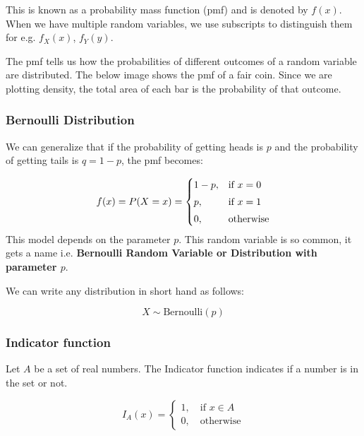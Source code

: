 This is known as a probability mass function (pmf) and is denoted by $f(x)$. When we have multiple random variables, we use subscripts to distinguish them for e.g. $f_X(x)$, $f_Y(y)$.

The pmf tells us how the probabilities of different outcomes of a random variable are distributed. The below image shows the pmf of a fair coin. Since we are plotting density, the total area of each bar is the probability of that outcome.


\subsubsection{Bernoulli Distribution}

We can generalize that if the probability of getting heads is $p$ and the probability of getting tails is $q = 1-p$, the pmf becomes:

\begin{equation}
    f(x) = P(X=x) = \begin{cases}
        \vspace{0.1cm} 1-p, & \text{if } x = 0 \\
        \vspace{0.1cm} p,   & \text{if } x = 1 \\
        0,                  & \text{otherwise}
    \end{cases}
\end{equation}
This model depends on the parameter $p$. This random variable is so common, it gets a name i.e. \textbf{Bernoulli Random Variable or Distribution with parameter $p$}.

We can write any distribution in short hand as follows:

\begin{equation}
    X \sim \text{Bernoulli}(p)
\end{equation}

\subsubsection{Indicator function}

Let $A$ be a set of real numbers. The Indicator function indicates if a number is in the set or not.

\begin{equation}
    I_A(x) = \begin{cases}
        1, \quad \text{if } x \in A \\
        0, \quad \text{otherwise}
    \end{cases}
\end{equation}

